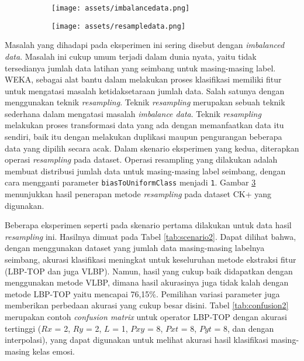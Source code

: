 \documentclass[review,3p,12pt,times]{elsarticle}
\begin{document}
\begin{figure}[hbt!]
\caption{(a) Grafik jumlah sampel untuk tiap label pada dataset CK+ sebelum \textit{resampling} (b) Grafik jumlah sampel untuk tiap label pada dataset CK+ setelah \textit{resampling}}
\centering
	\begin{subfigure}{0.45\textwidth}
	\caption{}
	\label{fig:imbalancedata}
	\texttt{[image: assets/imbalancedata.png]}
	\end{subfigure} \qquad	
	\begin{subfigure}{0.45\textwidth}
	\caption{}
	\label{fig:resampleddata}
	\texttt{[image: assets/resampledata.png]}
	\end{subfigure} \qquad
\end{figure}

Masalah yang dihadapi pada eksperimen ini sering disebut dengan \textit{imbalanced data}. Masalah ini cukup umum terjadi dalam dunia nyata, yaitu tidak tersedianya jumlah data latihan yang seimbang untuk masing-masing label. WEKA, sebagai alat bantu dalam melakukan proses klasifikasi memiliki fitur untuk mengatasi masalah ketidaksetaraan jumlah data. Salah satunya dengan menggunakan teknik \textit{resampling}. Teknik \textit{resampling} merupakan sebuah teknik sederhana dalam mengatasi masalah \textit{imbalance data}. Teknik \textit{resampling} melakukan proses transformasi data yang ada dengan memanfaatkan data itu sendiri, baik itu dengan melakukan duplikasi maupun pengurangan beberapa data yang dipilih secara acak. Dalam skenario eksperimen yang kedua, diterapkan operasi \textit{resampling} pada dataset. Operasi resampling yang dilakukan adalah membuat distribusi jumlah data untuk masing-masing label seimbang, dengan cara mengganti parameter \texttt{biasToUniformClass} menjadi \texttt{1}. Gambar \ref{fig:resampleddata} menunjukkan hasil penerapan metode \textit{resampling} pada dataset CK+ yang digunakan.

Beberapa eksperimen seperti pada skenario pertama dilakukan untuk data hasil \textit{resampling} ini. Hasilnya dimuat pada Tabel \ref{tab:scenario2}. Dapat dilihat bahwa, dengan menggunakan dataset yang jumlah data masing-masing labelnya seimbang, akurasi klasifikasi meningkat untuk keseluruhan metode ekstraksi fitur (LBP-TOP dan juga VLBP). Namun, hasil yang cukup baik didapatkan dengan menggunakan metode VLBP, dimana hasil akurasinya juga tidak kalah dengan metode LBP-TOP yaitu mencapai 76,15\%. Pemilihan variasi parameter juga memberikan perbedaan akurasi yang cukup besar disini. Tabel \ref{tab:confusion2} merupakan contoh \textit{confusion matrix} untuk operator LBP-TOP dengan akurasi tertinggi ($Rx$ = 2, $Ry$ = 2, $L$ = 1, $Pxy$ = 8, $Pxt$ = 8, $Pyt$ = 8, dan dengan interpolasi), yang dapat digunakan untuk melihat akurasi hasil klasifikasi masing-masing kelas emosi.
\end{document}
